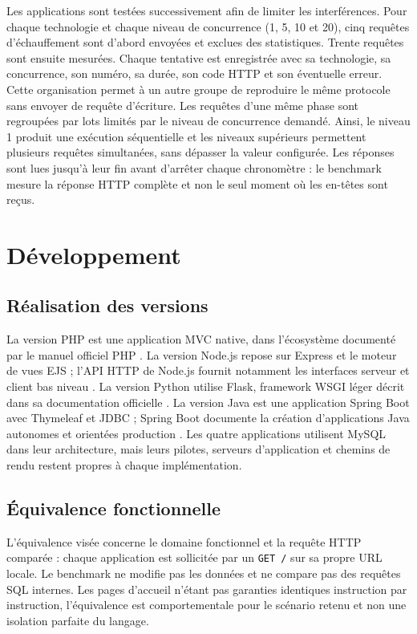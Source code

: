 \documentclass[conference,11pt]{IEEEtran}
\begin{document}
Les applications sont testées successivement afin de limiter les
interférences. Pour chaque technologie et chaque niveau de concurrence
(1, 5, 10 et 20), cinq requêtes d'échauffement sont d'abord envoyées et
exclues des statistiques. Trente requêtes sont ensuite mesurées. Chaque
tentative est enregistrée avec sa technologie, sa concurrence, son numéro,
sa durée, son code HTTP et son éventuelle erreur. Cette organisation permet
à un autre groupe de reproduire le même protocole sans envoyer de requête
d'écriture.
Les requêtes d'une même phase sont regroupées par lots limités par le niveau
de concurrence demandé. Ainsi, le niveau 1 produit une exécution séquentielle
et les niveaux supérieurs permettent plusieurs requêtes simultanées, sans
dépasser la valeur configurée. Les réponses sont lues jusqu'à leur fin avant
d'arrêter chaque chronomètre : le benchmark mesure la réponse HTTP complète
et non le seul moment où les en-têtes sont reçus.

\section{Développement}

\subsection{Réalisation des versions}

La version PHP est une application MVC native, dans l'écosystème documenté
par le manuel officiel PHP \cite{php-manual}. La version Node.js repose sur
Express et le moteur de vues EJS ; l'API HTTP de Node.js fournit notamment
les interfaces serveur et client bas niveau \cite{node-http}. La version
Python utilise Flask, framework WSGI léger décrit dans sa documentation
officielle \cite{flask}. La version Java est une application Spring Boot avec
Thymeleaf et JDBC ; Spring Boot documente la création d'applications Java
autonomes et orientées production \cite{spring-boot}. Les quatre
applications utilisent MySQL dans leur architecture, mais leurs pilotes,
serveurs d'application et chemins de rendu restent propres à chaque
implémentation.

\subsection{Équivalence fonctionnelle}

L'équivalence visée concerne le domaine fonctionnel et la requête HTTP
comparée : chaque application est sollicitée par un \texttt{GET /} sur sa
propre URL locale. Le benchmark ne modifie pas les données et ne compare pas
des requêtes SQL internes. Les pages d'accueil n'étant pas garanties
identiques instruction par instruction, l'équivalence est comportementale
pour le scénario retenu et non une isolation parfaite du langage.
\end{document}
